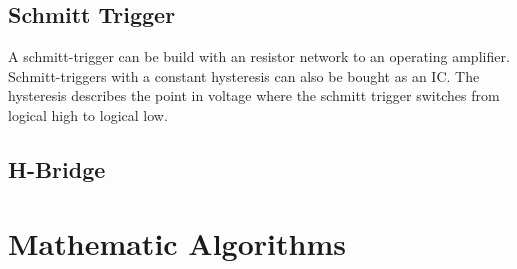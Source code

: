 \subsection{Schmitt Trigger}\label{sec:schmittTrigger}
A schmitt-trigger can be build with an resistor network to an operating amplifier.
Schmitt-triggers with a constant hysteresis can also be bought as an IC.
The hysteresis describes the point in voltage where the schmitt trigger switches from logical high to logical low.


\subsection{H-Bridge}\label{sec:hBridge}


\section{Mathematic Algorithms}\label{sec:mathematicAlgorithms}


